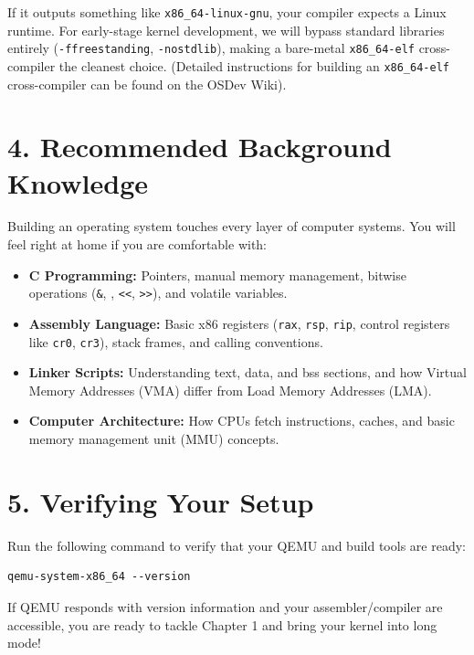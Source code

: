 If it outputs something like \texttt{x86\_64-linux-gnu}, your compiler expects a Linux runtime. For early-stage kernel development, we will bypass standard libraries entirely (\texttt{-ffreestanding}, \texttt{-nostdlib}), making a bare-metal \texttt{x86\_64-elf} cross-compiler the cleanest choice. (Detailed instructions for building an \texttt{x86\_64-elf} cross-compiler can be found on the OSDev Wiki).

\section{4. Recommended Background Knowledge}

Building an operating system touches every layer of computer systems. You will feel right at home if you are comfortable with:

\begin{itemize}
\tightlist
\item
  \textbf{C Programming:} Pointers, manual memory management, bitwise operations (\texttt{\&}, \texttt{\textbar{}}, \texttt{\textless{}\textless{}}, \texttt{\textgreater{}\textgreater{}}), and volatile variables.
\item
  \textbf{Assembly Language:} Basic x86 registers (\texttt{rax}, \texttt{rsp}, \texttt{rip}, control registers like \texttt{cr0}, \texttt{cr3}), stack frames, and calling conventions.
\item
  \textbf{Linker Scripts:} Understanding text, data, and bss sections, and how Virtual Memory Addresses (VMA) differ from Load Memory Addresses (LMA).
\item
  \textbf{Computer Architecture:} How CPUs fetch instructions, caches, and basic memory management unit (MMU) concepts.
\end{itemize}

\section{5. Verifying Your Setup}

Run the following command to verify that your QEMU and build tools are ready:

\begin{lstlisting}
qemu-system-x86_64 --version
\end{lstlisting}
If QEMU responds with version information and your assembler/compiler are accessible, you are ready to tackle Chapter 1 and bring your kernel into long mode!
